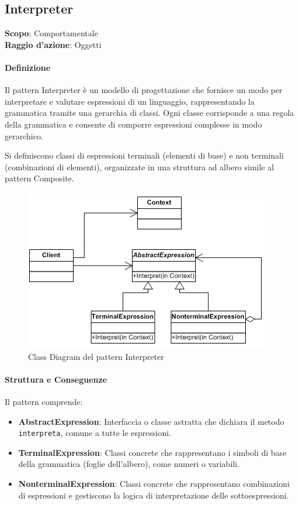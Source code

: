 \subsection{Interpreter}
\label{interpreter}

\textbf{Scopo}: Comportamentale \\
\textbf{Raggio d'azione}: Oggetti

\paragraph{Definizione} Il pattern Interpreter è un modello di progettazione che fornisce un modo per interpretare e valutare espressioni di un linguaggio, rappresentando la grammatica tramite una gerarchia di classi. Ogni classe corrisponde a una regola della grammatica e consente di comporre espressioni complesse in modo gerarchico.

Si definiscono classi di espressioni terminali (elementi di base) e non terminali (combinazioni di elementi), organizzate in una struttura ad albero simile al pattern Composite.

\begin{figure}[H]
    \centering
    \includegraphics[width=1\linewidth]{assets/pattern/interpreter/interpreter-struttura.png}
    \caption{Class Diagram del pattern Interpreter}
\end{figure}

\paragraph{Struttura e Conseguenze} Il pattern comprende:
\begin{itemize}
    \item \textbf{AbstractExpression}: Interfaccia o classe astratta che dichiara il metodo \texttt{interpreta}, comune a tutte le espressioni.
    \item \textbf{TerminalExpression}: Classi concrete che rappresentano i simboli di base della grammatica (foglie dell'albero), come numeri o variabili.
    \item \textbf{NonterminalExpression}: Classi concrete che rappresentano combinazioni di espressioni e gestiscono la logica di interpretazione delle sottoespressioni.
\end{itemize}

